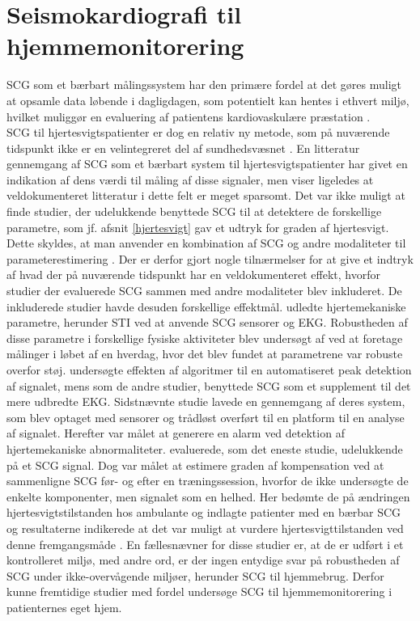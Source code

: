 \section{Seismokardiografi til hjemmemonitorering}
SCG som et bærbart målingssystem har den primære fordel at det gøres muligt at opsamle data løbende i dagligdagen, som potentielt kan hentes i ethvert miljø, hvilket muliggør en evaluering af patientens kardiovaskulære præstation \citep{inan2015}. \\ 
SCG til hjertesvigtspatienter er dog en relativ ny metode, som på nuværende tidspunkt ikke er en velintegreret del af sundhedsvæsnet \citep{}. En litteratur gennemgang af SCG som et bærbart system til hjertesvigtspatienter har givet en indikation af dens værdi til måling af disse signaler, men viser ligeledes at veldokumenteret litteratur i dette felt er meget sparsomt. Det var ikke muligt at finde studier, der udelukkende benyttede SCG til at detektere de forskellige parametre, som jf. afsnit \ref{hjertesvigt} gav et udtryk for graden af hjertesvigt. Dette skyldes, at man anvender en kombination af SCG og andre modaliteter til parameterestimering \citep{di2013wearable} \citep{Shafiq2016} \citep{Sahoo2017} \citep{Etemadi2018}. Der er derfor gjort nogle tilnærmelser for at give et indtryk af hvad der på nuværende tidspunkt har en veldokumenteret effekt, hvorfor studier der evaluerede SCG sammen med andre modaliteter blev inkluderet. De inkluderede studier havde desuden forskellige effektmål. \citet{Etemadi2018} udledte hjertemekaniske parametre, herunder STI ved at anvende SCG sensorer og EKG. Robustheden af disse parametre i forskellige fysiske aktiviteter blev undersøgt af \citet{di2013wearable} ved at foretage målinger i løbet af en hverdag, hvor det blev fundet at parametrene var robuste overfor støj. \citet{Shafiq2016} undersøgte effekten af algoritmer til en automatiseret peak detektion af signalet, mens \citet{Sahoo2017} som de andre studier, benyttede SCG som et supplement til det mere udbredte EKG. Sidstnævnte studie lavede en gennemgang af deres system, som blev optaget med sensorer og trådløst overført til en platform til en analyse af signalet. Herefter var målet at generere en alarm ved detektion af hjertemekaniske abnormaliteter. \citet{Inan2018} evaluerede, som det eneste studie, udelukkende på et SCG signal. Dog var målet at estimere graden af kompensation ved at sammenligne SCG før-  og efter en træningssession, hvorfor de ikke undersøgte de enkelte komponenter, men signalet som en helhed. Her bedømte de på ændringen hjertesvigtstilstanden hos ambulante og indlagte patienter med en bærbar SCG og resultaterne indikerede at det var muligt at vurdere hjertesvigttilstanden ved denne fremgangsmåde \citep{Inan2018}. En fællesnævner for disse studier er, at de er udført i et kontrolleret miljø, med andre ord, er der ingen entydige svar på robustheden af SCG under ikke-overvågende miljøer, herunder SCG til hjemmebrug. Derfor kunne fremtidige studier med fordel undersøge SCG til hjemmemonitorering i patienternes eget hjem.
